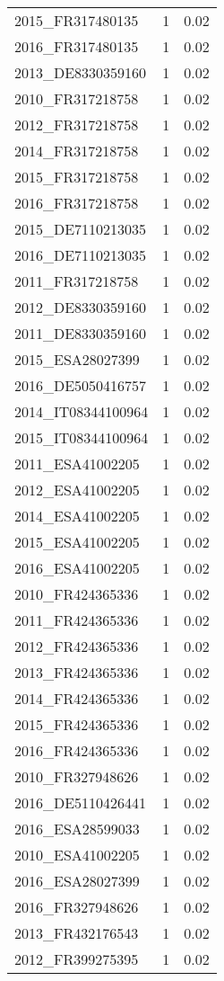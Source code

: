 \begin{table*}[htbp]
\begin{tabular}{lrr}
2015_FR317480135 & 1 & 0.02 \\
2016_FR317480135 & 1 & 0.02 \\
2013_DE8330359160 & 1 & 0.02 \\
2010_FR317218758 & 1 & 0.02 \\
2012_FR317218758 & 1 & 0.02 \\
2014_FR317218758 & 1 & 0.02 \\
2015_FR317218758 & 1 & 0.02 \\
2016_FR317218758 & 1 & 0.02 \\
2015_DE7110213035 & 1 & 0.02 \\
2016_DE7110213035 & 1 & 0.02 \\
2011_FR317218758 & 1 & 0.02 \\
2012_DE8330359160 & 1 & 0.02 \\
2011_DE8330359160 & 1 & 0.02 \\
2015_ESA28027399 & 1 & 0.02 \\
2016_DE5050416757 & 1 & 0.02 \\
2014_IT08344100964 & 1 & 0.02 \\
2015_IT08344100964 & 1 & 0.02 \\
2011_ESA41002205 & 1 & 0.02 \\
2012_ESA41002205 & 1 & 0.02 \\
2014_ESA41002205 & 1 & 0.02 \\
2015_ESA41002205 & 1 & 0.02 \\
2016_ESA41002205 & 1 & 0.02 \\
2010_FR424365336 & 1 & 0.02 \\
2011_FR424365336 & 1 & 0.02 \\
2012_FR424365336 & 1 & 0.02 \\
2013_FR424365336 & 1 & 0.02 \\
2014_FR424365336 & 1 & 0.02 \\
2015_FR424365336 & 1 & 0.02 \\
2016_FR424365336 & 1 & 0.02 \\
2010_FR327948626 & 1 & 0.02 \\
2016_DE5110426441 & 1 & 0.02 \\
2016_ESA28599033 & 1 & 0.02 \\
2010_ESA41002205 & 1 & 0.02 \\
2016_ESA28027399 & 1 & 0.02 \\
2016_FR327948626 & 1 & 0.02 \\
2013_FR432176543 & 1 & 0.02 \\
2012_FR399275395 & 1 & 0.02 \\

\end{tabular}
\end{table*}
